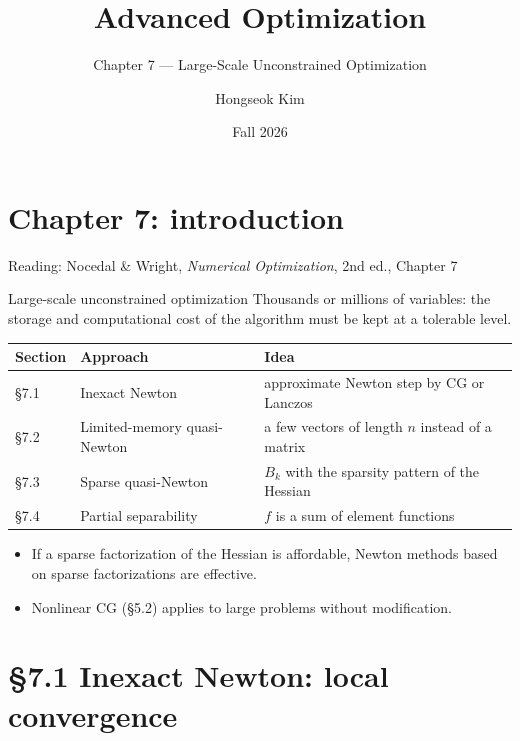 \documentclass[aspectratio=169,12pt]{beamer}
\title{Advanced Optimization}
\subtitle{Chapter 7 --- Large-Scale Unconstrained Optimization}
\author{Hongseok Kim}
\institute{Department of Electronic Engineering, Sogang University}
\date{Fall 2026}
\begin{document}
\section{Chapter 7: introduction}

\begin{frame}
  \titlepage
  \begin{center}\small
    Reading: Nocedal \& Wright, \emph{Numerical Optimization}, 2nd ed., Chapter 7
  \end{center}
\end{frame}

\begin{frame}{Large-scale unconstrained optimization}
  Thousands or millions of variables: the \alert{storage} and \alert{computational cost} of the
  algorithm must be kept at a tolerable level.

  \vspace{0.3em}
  \begin{center}
  \small\setlength\tabcolsep{5pt}
  \begin{tabular}{lll}
    \toprule
    Section & Approach & Idea \\
    \midrule
    \S7.1 & Inexact Newton & approximate Newton step by CG or Lanczos \\
    \S7.2 & Limited-memory quasi-Newton & a few vectors of length $n$ instead of a matrix \\
    \S7.3 & Sparse quasi-Newton & $B_{k}$ with the sparsity pattern of the Hessian \\
    \S7.4 & Partial separability & $f$ is a sum of element functions \\
    \bottomrule
  \end{tabular}
  \end{center}

  \begin{itemize}\setlength\itemsep{0.3em}
    \item If a sparse factorization of the Hessian is affordable, Newton methods based on
      sparse factorizations are effective.
    \item Nonlinear CG (\S5.2) applies to large problems without modification.
  \end{itemize}
\end{frame}

\section{\S7.1 Inexact Newton: local convergence}
\end{document}
